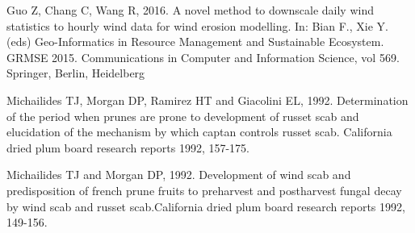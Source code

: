 \documentclass[a4paper]{book}
\begin{document}
\begin{References}\relax
Guo Z, Chang C, Wang R, 2016. A novel method to downscale daily wind
statistics to hourly wind data for wind erosion modelling. In: Bian F.,
Xie Y. (eds) Geo-Informatics in Resource Management and Sustainable
Ecosystem. GRMSE 2015. Communications in Computer and Information Science,
vol 569. Springer, Berlin, Heidelberg

Michailides TJ, Morgan DP, Ramirez HT and Giacolini EL, 1992. Determination
of the period when prunes are prone to development of russet scab and
elucidation of the mechanism by which captan controls russet scab.
California dried plum board research reports 1992, 157-175.

Michailides TJ and Morgan DP, 1992. Development of wind scab and
predisposition of french prune fruits to preharvest and postharvest
fungal decay by wind scab and russet scab.California dried plum board
research reports 1992, 149-156.
\end{References}
%
\begin{Examples}
\end{Examples}
\printindex{}
\end{document}
